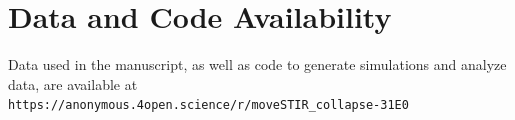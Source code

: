﻿\documentclass[11pt]{article}
\begin{document}





\section*{Data and Code Availability}

Data used in the manuscript, as well as code to generate simulations and analyze data, are available at \texttt{https://anonymous.4open.science/r/moveSTIR\_collapse-31E0}




\end{document}
